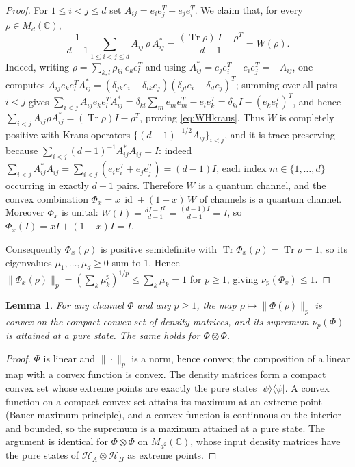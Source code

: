 \documentclass{amsart}
\newtheorem{lemma}{Lemma}
\theoremstyle{definition}
\DeclareMathOperator{\Tr}{Tr}
\DeclareMathOperator{\id}{id}
\newcommand{\HH}{\mathcal{H}}
\begin{document}
\begin{proof}
For $1\le i<j\le d$ set $A_{ij}=e_ie_j^{T}-e_je_i^{T}$. We claim that, for every
$\rho\in M_d(\mathbb C)$,
\begin{equation}\label{eq:WHkraus}
\frac{1}{d-1}\sum_{1\le i<j\le d}A_{ij}\,\rho\,A_{ij}^{*}
=\frac{(\Tr\rho)\,I-\rho^{T}}{d-1}=W(\rho).
\end{equation}
Indeed, writing $\rho=\sum_{k,l}\rho_{kl}\,e_ke_l^{T}$ and using
$A_{ij}^{*}=e_je_i^{T}-e_ie_j^{T}=-A_{ij}$, one computes
$A_{ij}e_ke_l^{T}A_{ij}^{*}
=(\delta_{jk}e_i-\delta_{ik}e_j)(\delta_{jl}e_i-\delta_{il}e_j)^{T}$;
summing over all pairs $i<j$ gives
$\sum_{i<j}A_{ij}e_ke_l^{T}A_{ij}^{*}
=\delta_{kl}\sum_{m}e_me_m^{T}-e_le_k^{T}
=\delta_{kl}I-(e_ke_l^{T})^{T}$, and hence
$\sum_{i<j}A_{ij}\rho A_{ij}^{*}=(\Tr\rho)I-\rho^{T}$, proving
\eqref{eq:WHkraus}. Thus $W$ is completely positive with Kraus operators
$\{(d-1)^{-1/2}A_{ij}\}_{i<j}$, and it is trace preserving because
$\sum_{i<j}(d-1)^{-1}A_{ij}^{*}A_{ij}=I$: indeed
$\sum_{i<j}A_{ij}^{*}A_{ij}=\sum_{i<j}(e_ie_i^{T}+e_je_j^{T})=(d-1)I$, each
index $m\in\{1,\dots,d\}$ occurring in exactly $d-1$ pairs. Therefore $W$ is a
quantum channel, and the convex combination $\Phi_x=x\,\id+(1-x)\,W$ of channels
is a quantum channel. Moreover $\Phi_x$ is unital: $W(I)=\frac{dI-I^{T}}{d-1}
=\frac{(d-1)I}{d-1}=I$, so $\Phi_x(I)=xI+(1-x)I=I$.

Consequently $\Phi_x(\rho)$ is positive semidefinite with
$\Tr\Phi_x(\rho)=\Tr\rho=1$, so its eigenvalues $\mu_1,\dots,\mu_d\ge0$ sum to
$1$. Hence $\|\Phi_x(\rho)\|_p=(\sum_k\mu_k^{p})^{1/p}\le\sum_k\mu_k=1$ for
$p\ge1$, giving $\nu_p(\Phi_x)\le1$.
\end{proof}

\begin{lemma}\label{lem:pure}
For any channel $\Phi$ and any $p\ge1$, the map
$\rho\mapsto\|\Phi(\rho)\|_p$ is convex on the compact convex set of density
matrices, and its supremum $\nu_p(\Phi)$ is attained at a pure state. The same
holds for $\Phi\otimes\Phi$.
\end{lemma}

\begin{proof}
$\Phi$ is linear and $\|\cdot\|_p$ is a norm, hence convex; the composition of a
linear map with a convex function is convex. The density matrices form a compact
convex set whose extreme points are exactly the pure states
$|\psi\rangle\langle\psi|$. A convex function on a compact convex set attains its
maximum at an extreme point (Bauer maximum principle), and a convex function is
continuous on the interior and bounded, so the supremum is a maximum attained at
a pure state. The argument is identical for $\Phi\otimes\Phi$ on
$M_{d^2}(\mathbb C)$, whose input density matrices have the pure states of
$\HH_A\otimes\HH_B$ as extreme points.
\end{proof}
\end{document}
